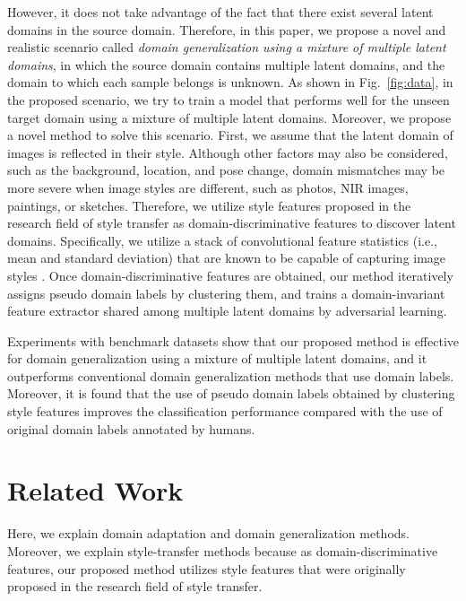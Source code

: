 \documentclass[letterpaper]{article} \usepackage{aaai20}  \usepackage{times}  \usepackage{helvet} \usepackage{courier}  \usepackage[hyphens]{url}  \usepackage{graphicx} \urlstyle{rm} \def\UrlFont{\rm}  \usepackage{graphicx}  \usepackage[whole]{bxcjkjatype}
\begin{document}
However, it does not take advantage of the fact that there exist several latent domains in the source domain. Therefore, in this paper, we propose a novel and realistic scenario called \textit{domain generalization using a mixture of multiple latent domains}, in which the source domain contains multiple latent domains, and the domain to which each sample belongs is unknown. As shown in Fig.~\ref{fig:data}, in the proposed scenario, we try to train a model that performs well for the unseen target domain using a mixture of multiple latent domains. Moreover, we propose a novel method to solve this scenario. First, we assume that the latent domain of images is reflected in their style. Although other factors may also be considered, such as the background, location, and pose change, domain mismatches may be more severe when image styles are different, such as photos, NIR images, paintings, or sketches. Therefore, we utilize style features proposed in the research field of style transfer as domain-discriminative features to discover latent domains. Specifically, we utilize a stack of convolutional feature statistics (i.e., mean and standard deviation) that are known to be capable of capturing image styles \cite{Li}.
Once domain-discriminative features are obtained, our method iteratively assigns pseudo domain labels by clustering them, and trains a domain-invariant feature extractor shared among multiple latent domains by adversarial learning.\par
Experiments with benchmark datasets show that our proposed method is effective for domain generalization using a mixture of multiple latent domains, and it outperforms conventional domain generalization methods that use domain labels. Moreover, it is found that the use of pseudo domain labels obtained by clustering style features improves the classification performance compared with the use of original domain labels annotated by humans.\par


\section{Related Work}
Here, we explain domain adaptation and domain generalization methods.
Moreover, we explain style-transfer methods because as domain-discriminative features, our proposed method utilizes style features that were originally proposed in the research field of style transfer.
\end{document}
